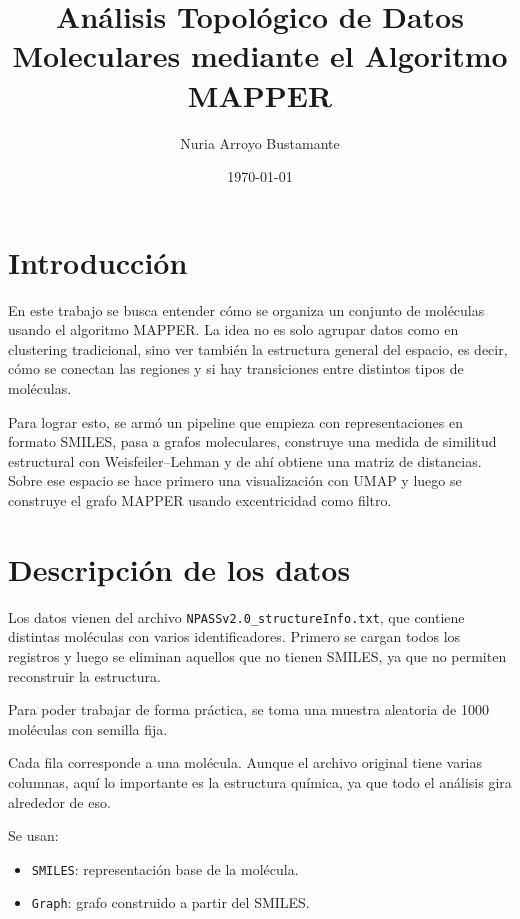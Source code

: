 \documentclass[12pt]{article}
\title{An\'alisis Topol\'ogico de Datos Moleculares mediante el Algoritmo MAPPER}
\author{Nuria Arroyo Bustamante}
\date{\today}
\begin{document}
\maketitle

\onehalfspacing

\section{Introducci\'on}

En este trabajo se busca entender cómo se organiza un conjunto de moléculas usando el algoritmo MAPPER. La idea no es solo agrupar datos como en clustering tradicional, sino ver también la estructura general del espacio, es decir, cómo se conectan las regiones y si hay transiciones entre distintos tipos de moléculas.

Para lograr esto, se armó un pipeline que empieza con representaciones en formato SMILES, pasa a grafos moleculares, construye una medida de similitud estructural con Weisfeiler--Lehman y de ahí obtiene una matriz de distancias. Sobre ese espacio se hace primero una visualización con UMAP y luego se construye el grafo MAPPER usando excentricidad como filtro.

\section{Descripci\'on de los datos}

Los datos vienen del archivo \texttt{NPASSv2.0\_structureInfo.txt}, que contiene distintas moléculas con varios identificadores. Primero se cargan todos los registros y luego se eliminan aquellos que no tienen SMILES, ya que no permiten reconstruir la estructura.

Para poder trabajar de forma práctica, se toma una muestra aleatoria de 1000 moléculas con semilla fija.

Cada fila corresponde a una molécula. Aunque el archivo original tiene varias columnas, aquí lo importante es la estructura química, ya que todo el análisis gira alrededor de eso.

Se usan:
\begin{itemize}
    \item \texttt{SMILES}: representación base de la molécula.
    \item \texttt{Graph}: grafo construido a partir del SMILES.
\end{itemize}
\end{document}
